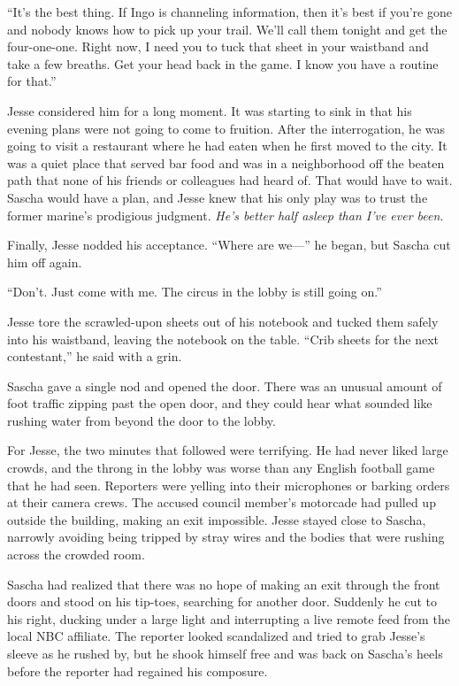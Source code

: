 \documentclass[12pt]{book}
\begin{document}
``It's the best thing.  If Ingo is channeling information, then it's best if you're gone and nobody knows how to pick up your trail.  We'll call them tonight and get the four-one-one.  Right now, I need you to tuck that sheet in your waistband and take a few breaths.  Get your head back in the game.  I know you have a routine for that.''

Jesse considered him for a long moment.  It was starting to sink in that his evening plans were not going to come to fruition.  After the interrogation, he was going to visit a restaurant where he had eaten when he first moved to the city.  It was a quiet place that served bar food and was in a neighborhood off the beaten path that none of his friends or colleagues had heard of.  That would have to wait.  Sascha would have a plan, and Jesse knew that his only play was to trust the former marine's prodigious judgment.  \emph{He's better half asleep than I've ever been}.

Finally, Jesse nodded his acceptance.  ``Where are we---'' he began, but Sascha cut him off again.

``Don't.  Just come with me.  The circus in the lobby is still going on.''

Jesse tore the scrawled-upon sheets out of his notebook and tucked them safely into his waistband, leaving the notebook on the table.  ``Crib sheets for the next contestant,'' he said with a grin.

Sascha gave a single nod and opened the door.  There was an unusual amount of foot traffic zipping past the open door, and they could hear what sounded like rushing water from beyond the door to the lobby.

For Jesse, the two minutes that followed were terrifying.  He had never liked large crowds, and the throng in the lobby was worse than any English football game that he had seen.  Reporters were yelling into their microphones or barking orders at their camera crews.  The accused council member's motorcade had pulled up outside the building, making an exit impossible.  Jesse stayed close to Sascha, narrowly avoiding being tripped by stray wires and the bodies that were rushing across the crowded room.

Sascha had realized that there was no hope of making an exit through the front doors and stood on his tip-toes, searching for another door.  Suddenly he cut to his right, ducking under a large light and interrupting a live remote feed from the local NBC affiliate.  The reporter looked scandalized and tried to grab Jesse's sleeve as he rushed by, but he shook himself free and was back on Sascha's heels before the reporter had regained his composure.
\end{document}
